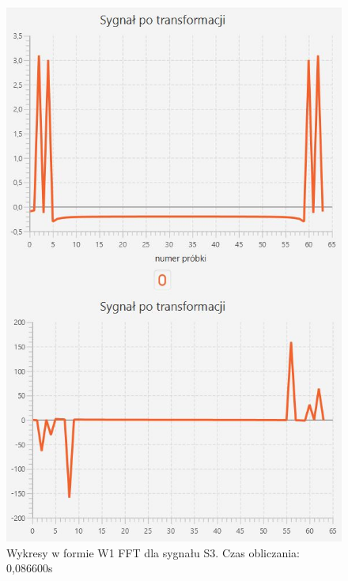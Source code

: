 \documentclass[12pt]{article}
\begin{document}
\begin{figure}[H]
	\centering
	\includegraphics[width=.8\linewidth]{FFT-S3-W1}
	\caption{Wykresy w formie W1 FFT dla sygnału S3. Czas obliczania: 0,086600s}
	\label{S3_sygnal}
\end{figure}
\end{document}

